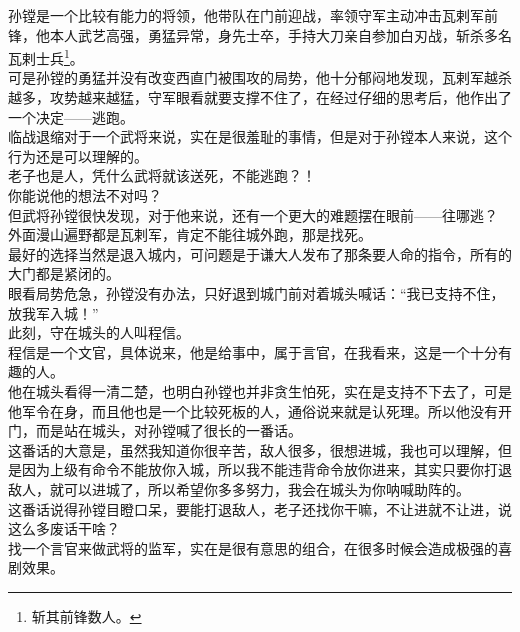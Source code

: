 \begin{multicols}{\theparacolNo}
孙镗是一个比较有能力的将领，他带队在门前迎战，率领守军主动冲击瓦剌军前锋，他本人武艺高强，勇猛异常，身先士卒，手持大刀亲自参加白刃战，斩杀多名瓦剌士兵\footnote{斩其前锋数人。}。\\

可是孙镗的勇猛并没有改变西直门被围攻的局势，他十分郁闷地发现，瓦剌军越杀越多，攻势越来越猛，守军眼看就要支撑不住了，在经过仔细的思考后，他作出了一个决定——逃跑。\\

临战退缩对于一个武将来说，实在是很羞耻的事情，但是对于孙镗本人来说，这个行为还是可以理解的。\\

老子也是人，凭什么武将就该送死，不能逃跑？！\\

你能说他的想法不对吗？\\

但武将孙镗很快发现，对于他来说，还有一个更大的难题摆在眼前——往哪逃？\\

外面漫山遍野都是瓦剌军，肯定不能往城外跑，那是找死。\\

最好的选择当然是退入城内，可问题是于谦大人发布了那条要人命的指令，所有的大门都是紧闭的。\\

眼看局势危急，孙镗没有办法，只好退到城门前对着城头喊话：“我已支持不住，放我军入城！”\\

此刻，守在城头的人叫程信。\\

程信是一个文官，具体说来，他是给事中，属于言官，在我看来，这是一个十分有趣的人。\\

他在城头看得一清二楚，也明白孙镗也并非贪生怕死，实在是支持不下去了，可是他军令在身，而且他也是一个比较死板的人，通俗说来就是认死理。所以他没有开门，而是站在城头，对孙镗喊了很长的一番话。\\

这番话的大意是，虽然我知道你很辛苦，敌人很多，很想进城，我也可以理解，但是因为上级有命令不能放你入城，所以我不能违背命令放你进来，其实只要你打退敌人，就可以进城了，所以希望你多多努力，我会在城头为你呐喊助阵的。\\

这番话说得孙镗目瞪口呆，要能打退敌人，老子还找你干嘛，不让进就不让进，说这么多废话干啥？\\

找一个言官来做武将的监军，实在是很有意思的组合，在很多时候会造成极强的喜剧效果。\\


\end{multicols}
